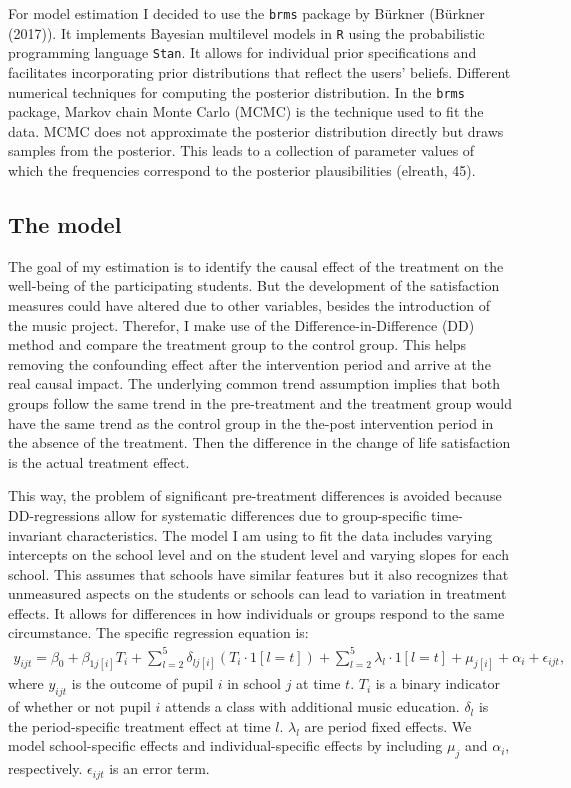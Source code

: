 \documentclass[a4, 12pt]{article}
\begin{document}
\label{ch:estimation}
For model estimation I decided to use the \texttt{brms} package by Bürkner (Bürkner (2017)). It implements Bayesian multilevel models in \texttt{R} using the probabilistic programming language \texttt{Stan}. It allows for individual prior specifications and facilitates incorporating prior distributions that reflect the users' beliefs. Different numerical techniques for computing the posterior distribution. In the \texttt{brms} package, Markov chain Monte Carlo (MCMC) is the technique used to fit the data. MCMC does not approximate the posterior distribution directly but draws samples from the posterior. This leads to a collection of parameter values of which the frequencies correspond to the posterior plausibilities (elreath, 45).

\hypertarget{the-model}{%
\subsection{The model}\label{the-model}}

\label{sec:model}
The goal of my estimation is to identify the causal effect of the treatment on the well-being of the participating students. But the development of the satisfaction measures could have altered due to other variables, besides the introduction of the music project. Therefor, I make use of the Difference-in-Difference (DD) method and compare the treatment group to the control group. This helps removing the confounding effect after the intervention period and arrive at the real causal impact.
The underlying common trend assumption implies that both groups follow the same trend in the pre-treatment and the treatment group would have the same trend as the control group in the the-post intervention period in the absence of the treatment. Then the difference in the change of life satisfaction is the actual treatment effect.

This way, the problem of significant pre-treatment differences is avoided because DD-regressions allow for systematic differences due to group-specific time-invariant characteristics.
The model I am using to fit the data includes varying intercepts on the school level and on the student level and varying slopes for each school. This assumes that schools have similar features but it also recognizes that unmeasured aspects on the students or schools can lead to variation in treatment effects. It allows for differences in how individuals or groups respond to the same circumstance. The specific regression equation is:
\begin{align}\label{eq:ml_DDmodel}
y_{ijt} = \beta_0 + \beta_{1j[i]} T_i + \sum\limits_{l=2}^5\delta_{lj[i]} (T_{i} \cdot 1[l=t]) + \sum\limits_{l=2}^5\lambda_l\cdot 1[l=t] + \mu_{j[i]} + \alpha_{i} + \epsilon_{ijt},
\end{align}
where \(y_{ijt}\) is the outcome of pupil \(i\) in school \(j\) at time \(t\). \(T_{i}\) is a binary indicator of whether or not pupil \(i\) attends a class with additional music education. \(\delta_l\) is the period-specific treatment effect at time \(l\). \(\lambda_l\) are period fixed effects. We model school-specific effects and individual-specific effects by including \(\mu_{j}\) and \(\alpha_{i}\), respectively. \(\epsilon_{ijt}\) is an error term.
\end{document}
